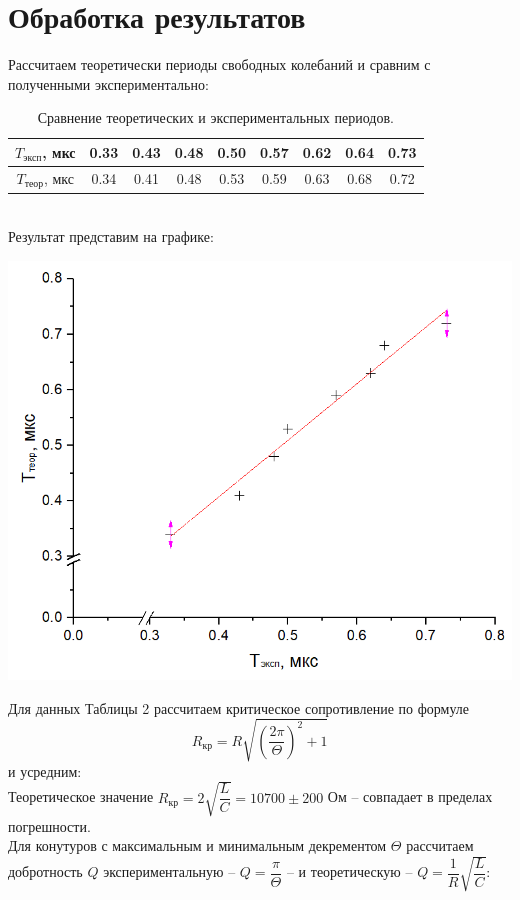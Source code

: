 \documentclass[a4paper,12pt]{report}
\begin{document}
\section*{Обработка результатов}
Рассчитаем теоретически периоды свободных колебаний и сравним с полученными экспериментально:
\begin{table}[h]
\centering
\begin{tabular}{|c|c|c|c|c|c|c|c|c|}
\hline
$T_{\text{эксп}}$, мкс & 0.33 & 0.43 & 0.48 & 0.50 & 0.57 & 0.62 & 0.64 & 0.73 \\ \hline
$T_{\text{теор}}$, мкс & 0.34 & 0.41 & 0.48 & 0.53 & 0.59 & 0.63 & 0.68 & 0.72 \\ \hline
\end{tabular}
\caption{Сравнение теоретических и экспериментальных периодов.}
\end{table}\\
Результат представим на графике:
\begin{center}
\includegraphics[scale=0.6]{5.png}
\end{center}
Для данных Таблицы 2 рассчитаем критическое сопротивление по формуле 
$$
R_{\text{кр}}=R\sqrt{\left( \dfrac{2\pi}{\Theta}\right)^2 + 1}
$$ 
и усредним:
\\
Теоретическое значение $R_{\text{кр}}=2\sqrt{\dfrac{L}{C}} = 10700 \pm 200$ Ом -- совпадает в пределах погрешности.\\
Для конутуров с максимальным и минимальным декрементом $\Theta$ рассчитаем добротность $Q$ экспериментальную -- $Q = \dfrac{\pi}{\Theta}$ -- и теоретическую -- $Q=\dfrac{1}{R}\sqrt{\dfrac{L}{C}}$:
\end{document}
